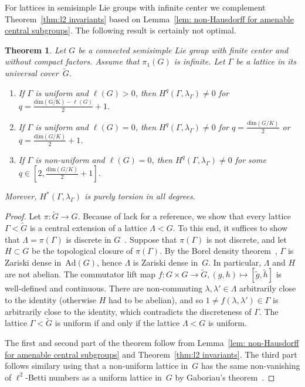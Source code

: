 \documentclass[12pt,reqno]{amsart}
\newtheorem{theorem}{Theorem}[section]
\theoremstyle{definition}
\begin{document}
For lattices in semisimple Lie groups with infinite center we complement Theorem~\ref{thm:l2 invariants} based 
on Lemma~\ref{lem: non-Hausdorff for amenable central subgroups}. The following result is certainly not optimal. 

\begin{theorem}
Let $G$ be a connected semisimple Lie group with finite center and without compact factors. Assume that $\pi_1(G)$ is infinite. Let $\Gamma$ be a lattice in its universal cover~$\widetilde G$. 
\begin{enumerate}
\item If $\Gamma$ is uniform and $\ell(G)>0$, then $H^q(\Gamma, \lambda_\Gamma)\ne 0$ for $q=\frac{\mathrm{dim(G/K)}-\ell(G)}{2}+1$. 
\item If $\Gamma$ is uniform and $\ell(G)=0$, then $H^q(\Gamma, \lambda_\Gamma)\ne 0$ for $q=\frac{\mathrm{dim}(G/K)}{2}$ or $q=\frac{\mathrm{dim}(G/K)}{2}+1$. 
\item If $\Gamma$ is non-uniform and $\ell(G)=0$, then $H^q(\Gamma, \lambda_\Gamma)\ne 0$ for some $q\in [2, \frac{\mathrm{dim}(G/K)}{2}+1]$. 
\end{enumerate} 
Morever, $H^\ast(\Gamma, \lambda_\Gamma)$ is purely torsion in all degrees. 
\end{theorem}


\begin{proof}
Let $\pi\colon\widetilde G\to G$.
Because of lack for a reference, we show that every lattice $\Gamma<\widetilde G$ is a central extension of a lattice $\Lambda<G$. To this end, it suffices to show that $\Lambda=\pi(\Gamma)$ is discrete in $G$~\cite[Theorem~1.13 on p.~23]{raghunathan}. Suppose that $\pi(\Gamma)$ is not discrete, and let $H\subset G$ be the topological closure of $\pi(\Gamma)$. By the Borel density theorem~\cite[Section~5]{raghunathan}, $\Gamma$ is Zariski dense 
in~$\mathrm{Ad}(G)$, hence $\Lambda$ is Zariski dense in~$G$. In particular, $\Lambda$ and $H$ are not abelian. 
The commutator lift map $f\colon G\times G\to \widetilde G, (g,h)\mapsto [\tilde g,\tilde h]$ is well-defined and continuous. There are non-commuting $\lambda, \lambda'\in \Lambda$ arbitrarily close to the identity (otherwise $H$ had to be abelian), and so $1\ne f(\lambda, \lambda')\in\Gamma$ is arbitrarily close to the identity, which contradicts the discreteness of $\Gamma$. The lattice $\Gamma<\widetilde G$ is uniform if and only if the lattice $\Lambda<G$ is uniform. 

The first and second part of the theorem follow from Lemma~\ref{lem: non-Hausdorff for amenable central subgroups} and Theorem~\ref{thm:l2 invariants}. The third part follows similary using that a non-uniform lattice in~$G$ has the same non-vanishing of $\ell^2$-Betti numbers as a uniform lattice in~$G$ by Gaboriau's theorem~\cite{gaboriau}. 
\end{proof}
\end{document}
